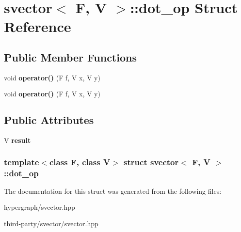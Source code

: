 \hypertarget{structsvector_1_1dot__op}{
\section{svector$<$ F, V $>$::dot\_\-op Struct Reference}
\label{structsvector_1_1dot__op}
}
\subsection*{Public Member Functions}
\begin{DoxyCompactItemize}
\item 
\hypertarget{structsvector_1_1dot__op_ad9780aa1774c192931b6a7ff15f96921}{
void {\bfseries operator()} (F f, V x, V y)}
\label{structsvector_1_1dot__op_ad9780aa1774c192931b6a7ff15f96921}

\item 
\hypertarget{structsvector_1_1dot__op_ad9780aa1774c192931b6a7ff15f96921}{
void {\bfseries operator()} (F f, V x, V y)}
\label{structsvector_1_1dot__op_ad9780aa1774c192931b6a7ff15f96921}

\end{DoxyCompactItemize}
\subsection*{Public Attributes}
\begin{DoxyCompactItemize}
\item 
\hypertarget{structsvector_1_1dot__op_a82d3dfb515ff4973a010c08669a221b4}{
V {\bfseries result}}
\label{structsvector_1_1dot__op_a82d3dfb515ff4973a010c08669a221b4}

\end{DoxyCompactItemize}
\subsubsection*{template$<$class F, class V$>$ struct svector$<$ F, V $>$::dot\_\-op}



The documentation for this struct was generated from the following files:\begin{DoxyCompactItemize}
\item 
hypergraph/svector.hpp\item 
third-\/party/svector/svector.hpp\end{DoxyCompactItemize}
